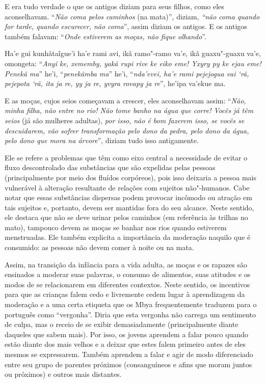 \begin{paracol}{2}
\bigskip

\switchcolumn
\noindent
E era tudo verdade o que os antigos diziam para seus filhos, como eles
aconselhavam. ``\emph{Não coma pelos caminhos} (na mata)''\emph{,}
diziam, \emph{``não coma quando for tarde, quando escurecer, não
coma}'', assim diziam os antigos. E os antigos também falavam:
``\emph{Onde estiverem as moças, não fique olhando}''.

\smallskip

\switchcolumn
\noindent
Ha'e gui kunhãtaĩgue'i ha'e rami avi, ikã ramo"-ramo va'e, ikã
guaxu"-guaxu va'e, omongeta: ``\emph{Anyĩ ke, xememby, yakã rupi rive ke
eiko eme! Yxyry py ke ejau eme! Penekã ma}'' he'i, ``\emph{penekãmba
ma}'' he'i, ``\emph{nda'evei, ha'e rami pejejogua vai `rã, pejepota `rã,
ita ja re, yy ja re, yvyra rovapy ja re}'', he'ipa va'ekue ma.

\bigskip

\switchcolumn
\noindent
E as moças, cujos seios começavam a crescer, eles aconselhavam assim:
``\emph{Não, minha filha, não entre no rio! Não tome banho na água que
corre! Vocês já têm seios} (já são mulheres adultas), \emph{por isso,}
\emph{não é bom fazerem isso, se vocês se descuidarem, vão sofrer
transformação pelo dono da pedra, pelo dono da água, pelo dono que mora
na árvore}'', diziam tudo isso antigamente.\\
\end{paracol}

\bigskip

Ele se refere a problemas que têm como eixo central a necessidade de
evitar o fluxo descontrolado das substâncias que são expelidas pelas
pessoas (principalmente por meio dos fluídos corpóreos), pois isso
deixaria a pessoa mais vulnerável à alteração resultante de relações
com sujeitos não"-humanos. Cabe notar que essas substâncias dispersas
podem provocar incômodo ou atração em tais sujeitos e, portanto, devem
ser mantidas fora do seu alcance. Neste sentido, ele destaca que não se
deve urinar pelos caminhos (em referência às trilhas no mato), tampouco
devem as moças se banhar nos rios quando estiverem menstruadas. Ele
também explicita a importância da moderação naquilo que é consumido: as
pessoas não devem comer à noite ou na mata. 

Assim, na transição da infância para a vida adulta, as moças e os
rapazes são ensinados a moderar suas palavras, o consumo de alimentos,
suas atitudes e os modos de se relacionarem em diferentes contextos.
Neste sentido, os incentivos para que as crianças falem cedo e
livremente cedem lugar à aprendizagem da moderação e a uma certa
etiqueta que os Mbya frequentemente traduzem para o português como
``vergonha''. Diria que esta vergonha não carrega um sentimento de culpa,
mas o receio de se exibir demasiadamente (principalmente diante
daqueles que sabem mais). Por isso, os jovens aprendem a falar pouco
quando estão diante dos mais velhos e a deixar que estes falem primeiro
antes de eles mesmos se expressarem. Também aprendem a falar e agir de
modo diferenciado entre seu grupo de parentes próximos (consanguíneos e
afins que moram juntos ou próximos) e outros mais distantes. 

